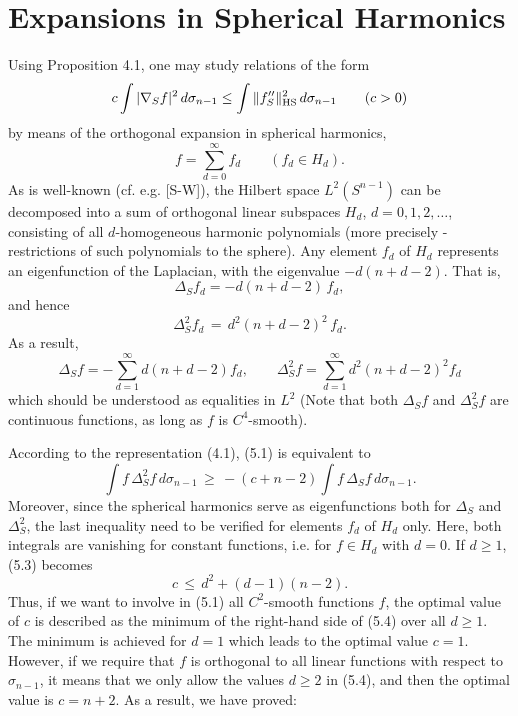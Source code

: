\documentclass[reqno,12pt]{amsart}
\theoremstyle{plain}
\begin{document}
\vskip10mm
\section{{\bf Expansions in Spherical Harmonics}}
\setcounter{equation}{0}

\vskip2mm
\noindent
Using Proposition 4.1, one may study relations of the form
\begin{equation}
c \int |\nabla_S f|^2\,d\sigma_{n-1} \leq
\int \|f''_S\|_{{\rm HS}}^2\,d\sigma_{n-1} \qquad (c>0)
\end{equation}
by means of the orthogonal expansion in spherical harmonics,
\begin{equation}
f = \sum_{d=0}^\infty f_d \qquad (f_d \in H_d).
\end{equation}
As is well-known (cf. e.g. [S-W]), the Hilbert space $L^2(S^{n-1})$ 
can be decomposed into a sum of orthogonal linear subspaces $H_d$, 
$d = 0,1,2,\dots$, consisting of all $d$-homogeneous harmonic polynomials
(more precisely - restrictions of such polynomials to the sphere).
Any element $f_d$ of $H_d$ represents an eigenfunction of the Laplacian, 
with the eigenvalue $- d(n+d-2)$. That is,
$$
\Delta_S f_d = - d(n+d-2)\,f_d,
$$
and hence
$$
\Delta^2_S f_d \, = \, d^2(n+d-2)^2\, f_d.
$$
As a result,
$$
\Delta_S f = -\sum_{d=1}^\infty d(n+d-2) f_d, \qquad
\Delta^2_S f = \sum_{d=1}^\infty d^2(n+d-2)^2 f_d
$$
which should be understood as equalities in $L^2$ (Note that both 
$\Delta_S f$ and $\Delta^2_S f$ are continuous functions, as long as
$f$ is $C^4$-smooth).

According to the representation (4.1), (5.1) is equivalent to
\begin{equation}
\int f\,\Delta^2_S f\, d\sigma_{n-1} \, \geq \, 
-(c + n-2)\int f\,\Delta_S f\, d\sigma_{n-1}.
\end{equation}
Moreover, since the spherical harmonics serve as eigenfunctions both for
$\Delta_S$ and $\Delta^2_S$, the last inequality need to be verified
for elements $f_d$ of $H_d$ only. Here, both integrals are vanishing for 
constant functions, i.e. for $f \in H_d$ with $d=0$. If $d \geq 1$, (5.3) becomes
\begin{equation}
c \, \leq \, d^2 + (d-1)(n-2).
\end{equation}
Thus, if we want to involve in (5.1) all $C^2$-smooth functions $f$,
the optimal value of $c$ is described as the minimum of the right-hand side 
of (5.4) over all $d \geq 1$. The minimum is achieved for $d=1$ which leads 
to the optimal value $c=1$. However, if we require that $f$ is orthogonal 
to all linear functions with respect to $\sigma_{n-1}$, it means that we 
only allow the values $d \geq 2$ in (5.4), and then the optimal value is 
$c = n+2$. As a result, we have proved:
\end{document}
